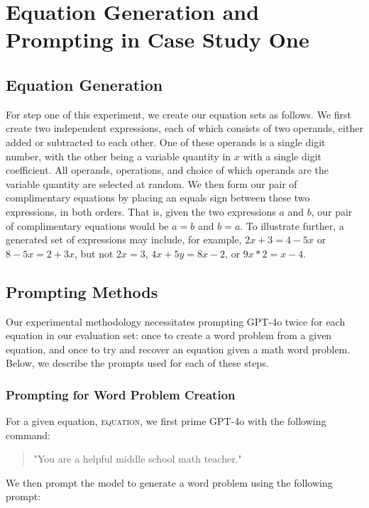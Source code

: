 \documentclass{article}
\begin{document}
\newpage

\section{Equation Generation and Prompting in Case Study One}\label{app:StudyOne}
\subsection{Equation Generation}

For step one of this experiment, we create our equation sets as follows. We first create two independent expressions, each of which consists of two operands, either added or subtracted to each other. One of these operands is a single digit number, with the other being a variable quantity in \(x\) with a single digit coefficient. All operands, operations, and choice of which operands are the variable quantity are selected at random. We then form our pair of complimentary equations by placing an equals sign between these two expressions, in both orders. That is, given the two expressions \(a\) and \(b\), our pair of complimentary equations would be \(a=b\) and \(b=a\). To illustrate further, a generated set of expressions may include, for example, \(2x + 3 = 4 - 5x\) or \(8 - 5x = 2 + 3x\), but not \(2x = 3\), \(4x + 5y = 8x - 2\), or \(9x * 2 = x - 4\).

\subsection{Prompting Methods}
Our experimental methodology necessitates prompting GPT-4o twice for each equation in our evaluation set: once to create a word problem from a given equation, and once to try and recover an equation given a math word problem. Below, we describe the prompts used for each of these steps.

\subsubsection{Prompting for Word Problem Creation}

For a given equation, \textsc{equation}, we first prime GPT-4o with the following command:

\begin{quote}
    "You are a helpful middle school math teacher."
\end{quote}

We then prompt the model to generate a word problem using the following prompt:
\end{document}

